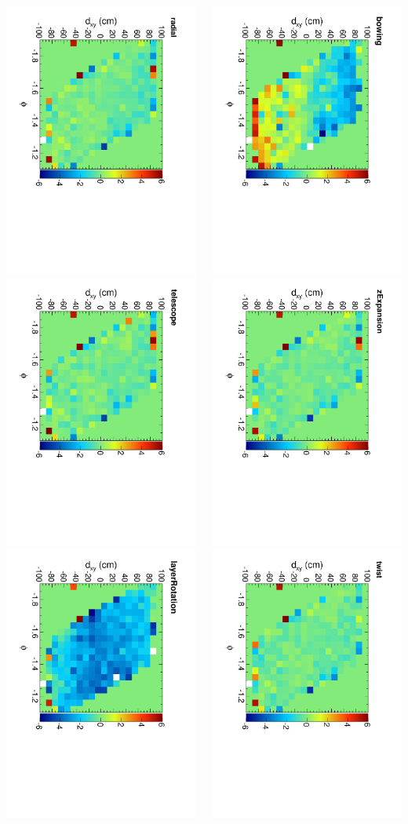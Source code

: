 \documentclass[compress]{beamer}
\begin{document}
\begin{frame}
\begin{columns}
\includegraphics[height=0.32\linewidth, angle=90]{residx-dxy-phi-high_radial.pdf}
\includegraphics[height=0.32\linewidth, angle=90]{residx-dxy-phi-high_telescope.pdf}
\includegraphics[height=0.32\linewidth, angle=90]{residx-dxy-phi-high_layerRotation.pdf}

\includegraphics[height=0.32\linewidth, angle=90]{residx-dxy-phi-high_bowing.pdf}
\includegraphics[height=0.32\linewidth, angle=90]{residx-dxy-phi-high_zExpansion.pdf}
\includegraphics[height=0.32\linewidth, angle=90]{residx-dxy-phi-high_twist.pdf}


\end{columns}
\end{frame}
\end{document}
